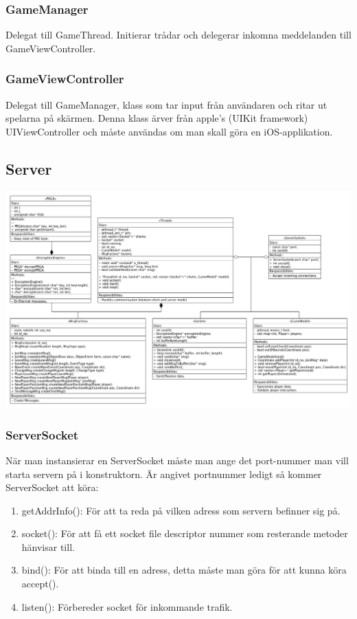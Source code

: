 \documentclass[10pt, titlepage, oneside, a4paper]{article}
\begin{document}
		\subsubsection{GameManager}
		Delegat till GameThread. Initierar trådar och delegerar inkomna meddelanden till GameViewController.
		\subsubsection{GameViewController}
		Delegat till GameManager, klass som tar input från användaren och ritar ut spelarna på skärmen. Denna klass ärver från apple's (UIKit framework) UIViewController och  måste användas om man skall göra en iOS-applikation.
		
		\newpage
		\subsection{Server}
		\begin{center}
			\includegraphics[scale=.2]{./png/ServerClassDiagram.png}			
		\end{center}
		\subsubsection{ServerSocket}
		När man instansierar en ServerSocket måste man ange det port-nummer man vill starta servern på i konstruktorn. Är angivet portnummer ledigt så kommer ServerSocket att köra:
			\begin{enumerate}
				\item getAddrInfo(): För att ta reda på vilken adress som servern befinner sig på.
				\item socket(): För att få ett socket file descriptor nummer som resterande metoder hänvisar till.
				\item bind(): För att binda till en adress, detta måste man göra för att kunna köra accept().
				\item listen(): Förbereder socket för inkommande trafik.
			\end{enumerate}
			
\end{document}

